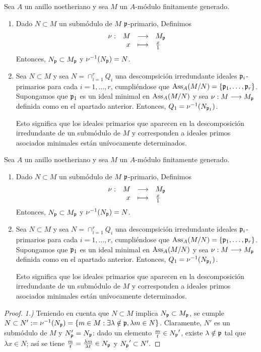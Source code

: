 \documentclass[../main.tex]{subfiles}
\begin{document}
\begin{theorem}
	Sea $A$ un anillo noetheriano y sea $M$ un $A$-módulo finitamente generado.\begin{enumerate}
		\item Dado $N\subset M$ un submódulo de $M$ $\mathfrak{p}$-primario, Definimos 
		$$\begin{array}{rrcl}
		\nu:&M&\longrightarrow&M_{\mathfrak{p}}\\
		&x&\longmapsto&\frac{x}{1}\\ \end{array}$$ Entonces, $N_{\mathfrak{p}}\subset M_{\mathfrak{p}}$ y $\nu^{-1}(N_{\mathfrak{p}})=N$.
		\item Sea $N\subset M$ y sea $N=\cap_{i=1}^rQ_i$ una descompsición irredundante ideales $\mathfrak{p}_i$-primarios para cada $i=1,\dots,r$, cumpliéndose que $\text{Ass}_A(M/N)=\{\mathfrak{p}_1,\dots,\mathfrak{p}_r\}$. Supongamos que $\mathfrak{p}_1$ es un ideal minimal en $\text{Ass}_A(M/N)$ y sea $\nu:M\longrightarrow M_{\mathfrak{p}}$ definida como en el apartado anterior. Entonces, $Q_1=\nu^{-1}(N_{\mathfrak{p}_1})$.
		
		Esto significa que los ideales primarios que aparecen en la descomposición irredundante de un submódulo de $M$ y corresponden a ideales primos asociados minimales están unívocamente determinados.
	\end{enumerate}

\begin{theorem}
	Sea $A$ un anillo noetheriano y sea $M$ un $A$-módulo finitamente generado.\begin{enumerate}
		\item Dado $N\subset M$ un submódulo de $M$ $\mathfrak{p}$-primario, Definimos 
		$$\begin{array}{rrcl}
		\nu:&M&\longrightarrow&M_{\mathfrak{p}}\\
		&x&\longmapsto&\frac{x}{1}\\ \end{array}$$ Entonces, $N_{\mathfrak{p}}\subset M_{\mathfrak{p}}$ y $\nu^{-1}(N_{\mathfrak{p}})=N$.
		\item Sea $N\subset M$ y sea $N=\cap_{i=1}^rQ_i$ una descompsición irredundante ideales $\mathfrak{p}_i$-primarios para cada $i=1,\dots,r$, cumpliéndose que $\text{Ass}_A(M/N)=\{\mathfrak{p}_1,\dots,\mathfrak{p}_r\}$. Supongamos que $\mathfrak{p}_1$ es un ideal minimal en $\text{Ass}_A(M/N)$ y sea $\nu:M\longrightarrow M_{\mathfrak{p}}$ definida como en el apartado anterior. Entonces, $Q_1=\nu^{-1}(N_{\mathfrak{p}_1})$.
		
		Esto significa que los ideales primarios que aparecen en la descomposición irredundante de un submódulo de $M$ y corresponden a ideales primos asociados minimales están unívocamente determinados.
	\end{enumerate}
\end{theorem}
\begin{proof}
	\textit{1.)} Teniendo en cuenta que $N\subset M$ implica $N_{\mathfrak{p}}\subset M_{\mathfrak{p}}$, se cumple $N\subset N':=\nu^{-1}(N_{\mathfrak{p}})=\{m\in M:\exists\lambda\notin\mathfrak{p}, \lambda m\in N\}$. Claramente, $N'$ es un submódulo de $M$ y $N_{\mathfrak{p}}'=N_{\mathfrak{p}}$: dado un elemento $\frac{m}{t}\in {N_{\mathfrak{p}}}'$, existe $\lambda\notin\mathfrak{p}$ tal que $\lambda x\in N$; así se tiene $\frac{m}{t}=\frac{\lambda m}{\lambda t}\in N_{\mathfrak{p}}$ y ${N_{\mathfrak{p}}}'\subset N'.$
	

\end{proof}
\end{theorem}
\end{document}
